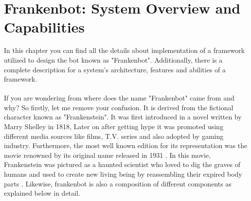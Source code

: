 \chapter{Frankenbot: System Overview and Capabilities \label{cha:chapter3}}
In this chapter you can find all the details about implementation of a framework utilized to design the bot known as "Frankenbot". Additionally, there is a complete description for a system's architecture, features and abilities of a framework. 
\\~\\
If you are wondering from where does the name "Frankenbot" came from and why? So firstly, let me remove your confusion. It is derived from the fictional character known as "Frankenstein". It was first introduced in a novel written by Marry Shelley in 1818, Later on after getting hype it was promoted using different media sources like films, T.V. series and also adopted by gaming industry. Furthermore, the most well known edition for its representation was the movie renowned by its original name released in 1931 \cite{frankenstein}. In this movie, Frankenstein was pictured as a haunted scientist who loved to dig the graves of humans and used to create new living being by reassembling their expired body parts \cite{frankensteinmovie}. Likewise, frankenbot is also a composition of different components as explained below in detail.

